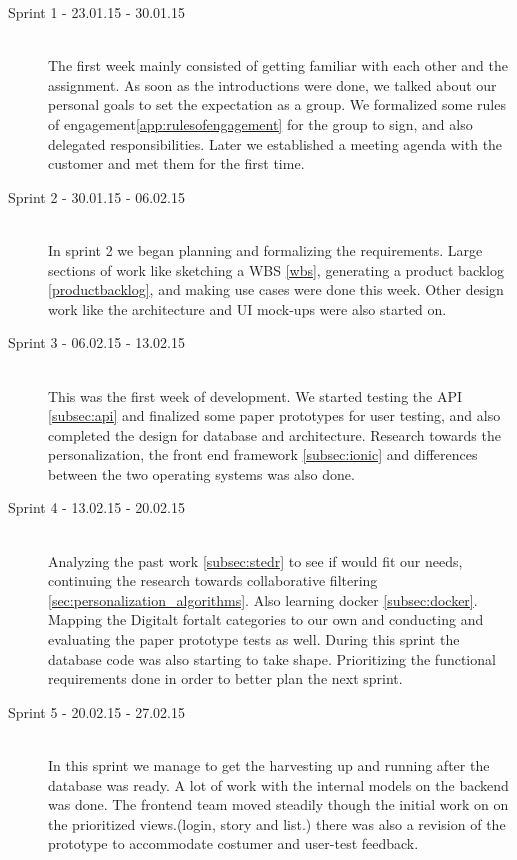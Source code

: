 \begin{description}
	
	\item[Sprint 1 - 23.01.15 - 30.01.15] \hfill \\ 
	The first week mainly consisted of getting familiar with each other and the assignment. As soon as the introductions were done, we talked about our personal goals to set the expectation as a group. We formalized some rules of engagement\ref{app:rulesofengagement} for the group to sign, and also delegated responsibilities. Later we established a meeting agenda with the customer and met them for the first time.
	
	\item[Sprint 2 - 30.01.15 - 06.02.15] \hfill \\ 
	In sprint 2 we began planning and formalizing the requirements. Large sections of work like sketching a WBS \ref{wbs}, generating a product backlog \ref{productbacklog}, and making use cases were done this week. Other design work like the architecture and UI mock-ups were also started on.
	
	\item[Sprint 3 - 06.02.15 - 13.02.15] \hfill \\ 
	This was the first week of development. We started testing the API \ref{subsec:api} and finalized some paper prototypes for user testing,  and also completed the design for database and architecture. Research towards the personalization, the front end framework \ref{subsec:ionic}  and differences between the two operating systems  was also done. 
	
	\item[Sprint 4 - 13.02.15 - 20.02.15] \hfill \\ 
	Analyzing the past work \ref{subsec:stedr} to see if would fit our needs, continuing the research towards collaborative filtering \ref{sec:personalization_algorithms}. Also learning docker \ref{subsec:docker}. Mapping the Digitalt fortalt  categories to our own and conducting and evaluating the paper prototype tests as well. During this sprint the database code was also starting to take shape. Prioritizing the functional requirements done in order to better plan the next sprint.  
	
	\item[Sprint 5 - 20.02.15 - 27.02.15] \hfill \\ 
	In this sprint we manage to get the harvesting up and running after the database was ready. A lot of work with the internal models on the backend was done. The frontend team moved steadily though the initial work on on the prioritized views.(login, story and list.) there was also a revision of the prototype to accommodate costumer and user-test feedback.
		

\end{description}
